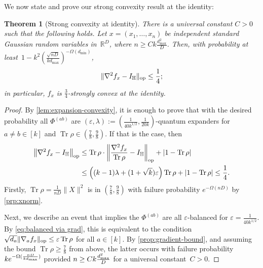 \documentclass[aos]{imsart}
\newtheorem{theorem}{Theorem}[section]
\theoremstyle{definition}
\numberwithin{equation}{section}
\DeclareMathOperator{\op}{op}
\DeclareMathOperator{\tr}{Tr}
\DeclarePairedDelimiter{\abs}{\lvert}{\rvert}
\DeclarePairedDelimiter{\norm}{\lVert}{\rVert}
\newcommand{\R}{{\mathbb{R}}}
\renewcommand{\H}{{\mathbb{H}}}
\newcommand{\eps}{\varepsilon}
\newcommand{\rv}{x}
\def\dmax{d_{\max}}
\begin{document}
We now state and prove our strong convexity result at the identity:

\begin{theorem}[Strong convexity at identity]\label{thm:tensor-convexity}
There is a universal constant $C>0$ such that the following holds.
Let $x = (x_1,\dots,x_n)$ be independent standard Gaussian random variables in~$\R^D$, where $n \geq C k \frac{\dmax^2}D$.
Then, with probability at least~$1 - k^2 ( \frac{\sqrt{nD}}{k \dmax} )^{-\Omega(d_{\min})}$,
\begin{align*}
  \norm{\nabla^2 f_x - I_\H}_{\op} \leq \frac14;
\end{align*}
in particular, $f_x$ is $\frac34$-strongly convex at the identity.
\end{theorem}
\begin{proof}
By \cref{lem:expansion-convexity}, it is enough to prove that with the desired probability all $\Phi^{(ab)}$ are $(\eps,\lambda):=(\frac1{40 k^{1/2}},\frac1{20k})$-quantum expanders for $a\neq b\in[k]$ and $\tr \rho \in (\frac78,\frac98)$.
If that is the case, then
\begin{align*}
  \norm*{\nabla^2 f_x - I_\H}_{\op}
&\leq \tr \rho \cdot  \norm*{\frac{\nabla^2 f_x}{\tr \rho} - I_\H}_{\op}  + \abs{1 - \tr\rho} \\
&\leq \left( (k-1)\lambda + (1 + \sqrt k) \eps \right) \tr\rho + \abs{1 - \tr\rho}
\leq \frac14.
\end{align*}
Firstly, $\tr \rho = \frac{1}{nD} \|X\|^2$ is in $(\frac78, \frac98)$ with failure probability $e^{-\Omega(nD)}$ by \cref{prp:xnorm}.

Next, we describe an event that implies the $\Phi^{(ab)}$ are all $\eps$-balanced for $\eps=\frac1{40k^{1/2}}$.
By \cref{eq:balanced via grad}, this is equivalent to the condition $\sqrt{d_a} \norm{\nabla_a f_{\rv}}_{\op} \leq \eps \tr \rho$ for all $a \in [k]$.
By \cref{prop:gradient-bound}, and assuming the bound $\tr \rho \geq \frac78$ from above, the latter occurs with failure probability~$k \smash{e^{-\Omega(\frac{nD}{k \dmax})}}$ provided $n \geq C k \smash{\frac{\dmax^2}D}$ for a universal constant~$C>0$.


\end{proof}
\end{document}
